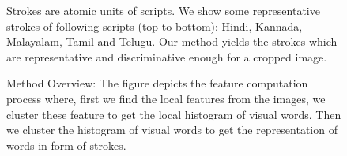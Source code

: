 \begin{figure} [!t]
\centering
{}
\caption{Strokes are atomic units of scripts. We show some representative strokes of following scripts (top to bottom): Hindi, Kannada, Malayalam, Tamil and Telugu. Our method yields the strokes which are representative and discriminative enough for a cropped image.}
\label{fig:strokes}
\end{figure} 

\begin{figure} [!t]
\centering
{}
\caption{Method Overview: The figure depicts the feature computation process where, first we find the local features from the images, we cluster these feature to get the local histogram of visual words. Then we cluster the histogram of visual words to get the representation of words in form of strokes.}
\label{fig:overview}
\end{figure} 


